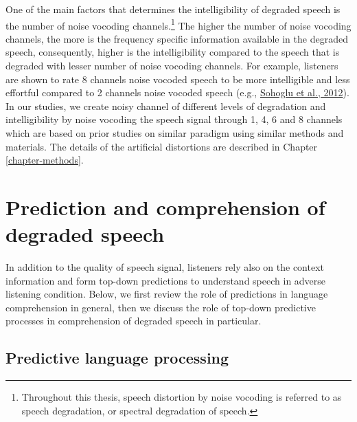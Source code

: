 \documentclass[a4paper, nobind]{templates/ociamthesis}
\begin{document}
One of the main factors that determines the intelligibility of degraded speech is the number of noise vocoding channels.\footnote{Throughout this thesis, speech distortion by noise vocoding is referred to as speech degradation, or spectral degradation of speech.}
The higher the number of noise vocoding channels, the more is the frequency specific information available in the degraded speech,
consequently, higher is the intelligibility compared to the speech that is degraded with lesser number of noise vocoding channels.
For example, listeners are shown to rate 8 channels noise vocoded speech to be more intelligible and less effortful compared to 2 channels noise vocoded speech (e.g., \protect\hyperlink{ref-Sohoglu2012}{Sohoglu et al., 2012}).
In our studies, we create noisy channel of different levels of degradation and intelligibility by noise vocoding the speech signal through 1, 4, 6 and 8 channels which are based on prior studies on similar paradigm using similar methods and materials.
The details of the artificial distortions are described in Chapter \ref{chapter-methods}.

\hypertarget{prediction-and-comprehension-of-degraded-speech}{%
\section{Prediction and comprehension of degraded speech}\label{prediction-and-comprehension-of-degraded-speech}}

In addition to the quality of speech signal, listeners rely also on the context information and form top-down predictions to understand speech in adverse listening condition.
Below, we first review the role of predictions in language comprehension in general,
then we discuss the role of top-down predictive processes in comprehension of degraded speech in particular.

\hypertarget{predictive-language-processing}{%
\subsection{Predictive language processing}\label{predictive-language-processing}}
\end{document}
